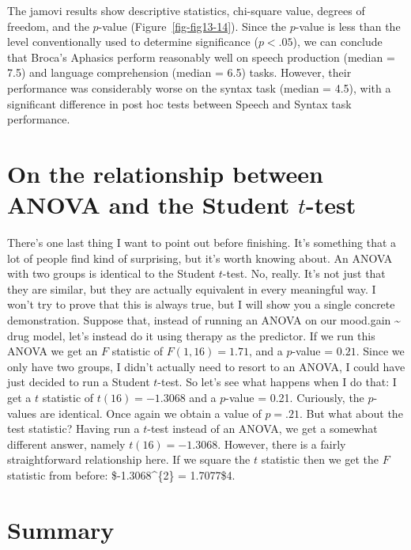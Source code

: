 \documentclass[
  a4paper,
]{book}
\begin{document}
The jamovi results show descriptive statistics, chi-square value,
degrees of freedom, and the \(p\)-value (Figure~\ref{fig-fig13-14}).
Since the \(p\)-value is less than the level conventionally used to
determine significance (\(p < .05\)), we can conclude that Broca's
Aphasics perform reasonably well on speech production (median = 7.5) and
language comprehension (median = 6.5) tasks. However, their performance
was considerably worse on the syntax task (median = 4.5), with a
significant difference in post hoc tests between Speech and Syntax task
performance.

\hypertarget{sec-On-the-relationship-between-ANOVA-and-the-Student-t-test}{%
\section{\texorpdfstring{On the relationship between ANOVA and the
Student
\(t\)-test}{On the relationship between ANOVA and the Student t-test}}\label{sec-On-the-relationship-between-ANOVA-and-the-Student-t-test}}

There's one last thing I want to point out before finishing. It's
something that a lot of people find kind of surprising, but it's worth
knowing about. An ANOVA with two groups is identical to the Student
\(t\)-test. No, really. It's not just that they are similar, but they
are actually equivalent in every meaningful way. I won't try to prove
that this is always true, but I will show you a single concrete
demonstration. Suppose that, instead of running an ANOVA on our
mood.gain \textasciitilde{} drug model, let's instead do it using
therapy as the predictor. If we run this ANOVA we get an \(F\) statistic
of \(F(1,16) = 1.71\), and a \(p\)-value = \(0.21\). Since we only have
two groups, I didn't actually need to resort to an ANOVA, I could have
just decided to run a Student \(t\)-test. So let's see what happens when
I do that: I get a \(t\) statistic of \(t(16) = -1.3068\) and a
\(p\)-value = 0.21. Curiously, the \(p\)-values are identical. Once
again we obtain a value of \(p = .21\). But what about the test
statistic? Having run a \(t\)-test instead of an ANOVA, we get a
somewhat different answer, namely \(t(16) = -1.3068\). However, there is
a fairly straightforward relationship here. If we square the \(t\)
statistic then we get the \(F\) statistic from before:
\$-1.3068\^{}\{2\} = 1.7077\$4.

\hypertarget{summary-1}{%
\section{Summary}\label{summary-1}}
\end{document}
